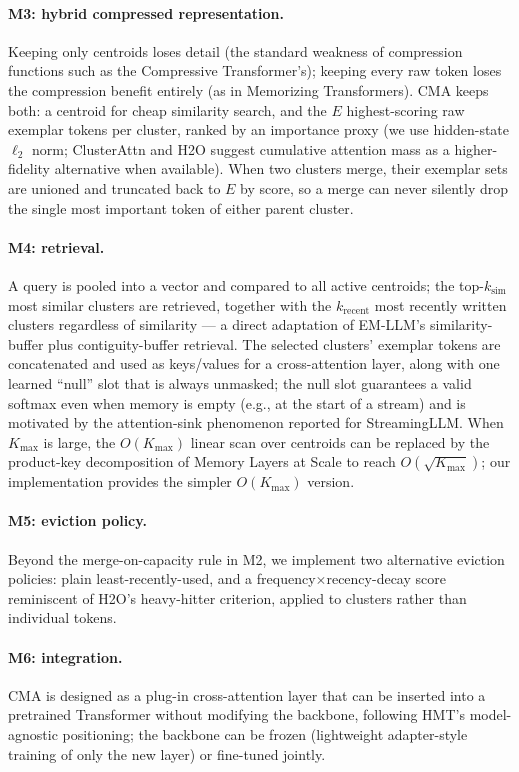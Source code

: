 \documentclass[11pt]{article}
\begin{document}
\paragraph{M3: hybrid compressed representation.}
Keeping only centroids loses detail (the standard weakness of compression functions such as the
Compressive Transformer's); keeping every raw token loses the compression benefit entirely (as
in Memorizing Transformers). CMA keeps both: a centroid for cheap similarity search, and the
$E$ highest-scoring raw exemplar tokens per cluster, ranked by an importance proxy (we use
hidden-state $\ell_2$ norm; ClusterAttn and H2O suggest cumulative attention mass as a
higher-fidelity alternative when available). When two clusters merge, their exemplar sets are
unioned and truncated back to $E$ by score, so a merge can never silently drop the single most
important token of either parent cluster.

\paragraph{M4: retrieval.}
A query is pooled into a vector and compared to all active centroids; the top-$k_{\text{sim}}$
most similar clusters are retrieved, together with the $k_{\text{recent}}$ most recently written
clusters regardless of similarity --- a direct adaptation of EM-LLM's similarity-buffer plus
contiguity-buffer retrieval. The selected clusters' exemplar tokens are concatenated and used as
keys/values for a cross-attention layer, along with one learned ``null'' slot that is always
unmasked; the null slot guarantees a valid softmax even when memory is empty (e.g., at the start
of a stream) and is motivated by the attention-sink phenomenon reported for
StreamingLLM. When $K_{\max}$ is large, the $O(K_{\max})$ linear scan over centroids can be
replaced by the product-key decomposition of Memory Layers at Scale to reach
$O(\sqrt{K_{\max}})$; our implementation provides the simpler $O(K_{\max})$ version.

\paragraph{M5: eviction policy.}
Beyond the merge-on-capacity rule in M2, we implement two alternative eviction policies: plain
least-recently-used, and a frequency$\times$recency-decay score reminiscent of H2O's
heavy-hitter criterion, applied to clusters rather than individual tokens.

\paragraph{M6: integration.}
CMA is designed as a plug-in cross-attention layer that can be inserted into a pretrained
Transformer without modifying the backbone, following HMT's model-agnostic positioning; the
backbone can be frozen (lightweight adapter-style training of only the new layer) or fine-tuned
jointly.
\end{document}
